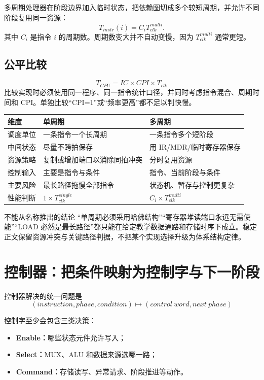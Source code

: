\documentclass[UTF8,fontset=fandol,11pt,a4paper]{ctexart}
\newcommand{\kw}[1]{\textbf{\color{deep}#1}}
\begin{document}
多周期处理器在阶段边界加入临时状态，把依赖图切成多个较短周期，并允许不同阶段复用同一资源：
\[
T_{instr}(i)=C_iT_{clk}^{multi}.
\]
其中 $C_i$ 是指令 $i$ 的周期数。周期数变大并不自动变慢，因为 $T_{clk}^{multi}$ 通常更短。

\subsection{公平比较}

\[
\boxed{T_{CPU}=IC\times CPI\times T_{clk}}
\]
比较实现时必须使用同一程序、同一指令统计口径，并同时考虑指令混合、周期时间和 CPI。单独比较“CPI=1”或“频率更高”都不足以判快慢。

\begin{center}
\small
\begin{tabularx}{\linewidth}{L{2.5cm}YY}
\toprule
维度 & 单周期 & 多周期 \\
\midrule
调度单位 & 一条指令一个长周期 & 一条指令多个短阶段 \\
中间状态 & 尽量不跨拍保存 & 用 IR/MDR/临时寄存器保存 \\
资源策略 & 复制或增加端口以消除同拍冲突 & 分时复用资源 \\
控制输入 & 主要是指令与条件 & 指令、当前阶段与条件 \\
主要风险 & 最长路径拖慢全部指令 & 状态机、暂存与控制更复杂 \\
性能判断 & $1\times T_{clk}^{single}$ & $C_i\times T_{clk}^{multi}$ \\
\bottomrule
\end{tabularx}
\end{center}

\begin{warnbox}{不能从名称推出的结论}
“单周期必须采用哈佛结构”“寄存器堆读端口永远无需使能”“LOAD 必然是最长路径”都只能在给定教学数据通路和存储时序下成立。稳定正文保留资源冲突与关键路径判据，不把某个实现选择升级为体系结构定律。
\end{warnbox}

\section{控制器：把条件映射为控制字与下一阶段}

控制器解决的统一问题是
\[
\boxed{
(instruction,phase,condition)
\longmapsto
(control\ word,next\ phase)
}
\]

控制字至少会包含三类决策：
\begin{itemize}
  \item \kw{Enable：}哪些状态元件允许写入；
  \item \kw{Select：}MUX、ALU 和数据来源选哪一路；
  \item \kw{Command：}存储读写、异常请求、阶段推进等动作。
\end{itemize}
\end{document}
